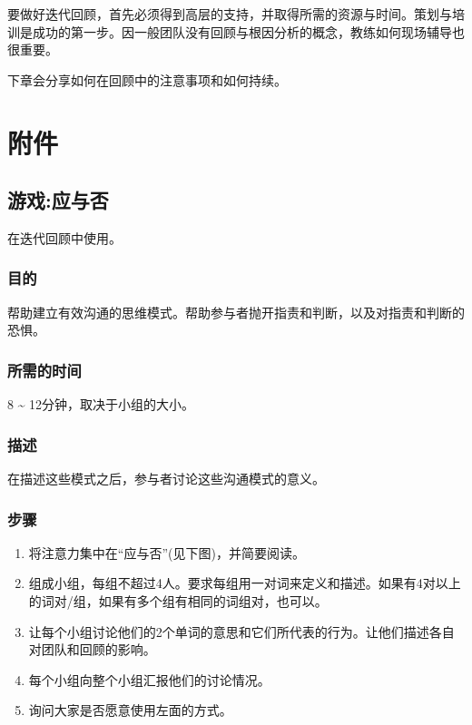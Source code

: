 要做好迭代回顾，首先必须得到高层的支持，并取得所需的资源与时间。策划与培训是成功的第一步。因一般团队没有回顾与根因分析的概念，教练如何现场辅导也很重要。

下章会分享如何在回顾中的注意事项和如何持续。

\hypertarget{ux9644ux4ef6}{%
\section{附件}\label{ux9644ux4ef6}}

\hypertarget{ux6e38ux620fux5e94ux4e0eux5426}{%
\subsection{游戏:应与否}\label{ux6e38ux620fux5e94ux4e0eux5426}}

在迭代回顾中使用。

\hypertarget{ux76eeux7684}{%
\subsubsection{目的}\label{ux76eeux7684}}

帮助建立有效沟通的思维模式。帮助参与者抛开指责和判断，以及对指责和判断的恐惧。

\hypertarget{ux6240ux9700ux7684ux65f6ux95f4}{%
\subsubsection{所需的时间}\label{ux6240ux9700ux7684ux65f6ux95f4}}

8 \textasciitilde{} 12分钟，取决于小组的大小。

\hypertarget{ux63cfux8ff0}{%
\subsubsection{描述}\label{ux63cfux8ff0}}

在描述这些模式之后，参与者讨论这些沟通模式的意义。

\hypertarget{ux6b65ux9aa4}{%
\subsubsection{步骤}\label{ux6b65ux9aa4}}

\begin{enumerate}
\tightlist
\item
  将注意力集中在``应与否''(见下图)，并简要阅读。
\item
  组成小组，每组不超过4人。要求每组用一对词来定义和描述。如果有4对以上的词对/组，如果有多个组有相同的词组对，也可以。
\item
  让每个小组讨论他们的2个单词的意思和它们所代表的行为。让他们描述各自对团队和回顾的影响。
\item
  每个小组向整个小组汇报他们的讨论情况。
\item
  询问大家是否愿意使用左面的方式。
\end{enumerate}


